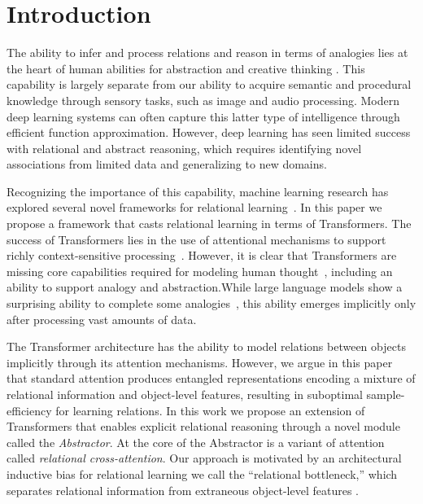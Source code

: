 \section{Introduction}

The ability to infer and process relations and reason in terms of analogies lies at the heart of human abilities for abstraction and creative thinking
\citep{snow,holyoak}. This capability is largely separate from our ability to acquire semantic and procedural knowledge through sensory tasks, such as image and audio processing. Modern deep learning systems can often capture this latter type of intelligence through efficient function approximation. However, deep learning has seen limited success with relational and abstract reasoning, which requires identifying novel associations from limited data and generalizing to new domains.

Recognizing the importance of this capability, machine learning research has explored several novel frameworks for relational learning~\citep{NTM, episodicControl, TEM,santoro1,battaglia,barrett:2018,shanahanExplicitlyRelationalNeural,esbn,mondal23learned}. In this paper we propose a framework that casts relational learning in terms of Transformers. The success of Transformers lies in the use of attentional mechanisms to support richly context-sensitive processing~\citep{vaswani2017attention,transformers,kerg2020untangling}. However, it is clear that Transformers are missing core capabilities required for modeling human thought~\citep{mahowald2023dissociating}, including an ability to support analogy and abstraction.While large language models show a surprising ability to complete some analogies~\citep{webb2023emergent}, this ability emerges implicitly only after processing vast amounts of data.

The Transformer architecture has the ability to model relations between objects implicitly through its attention mechanisms. However, we argue in this paper that standard attention produces entangled representations encoding a mixture of relational information and object-level features, resulting in suboptimal sample-efficiency for learning relations.
In this work we propose an extension of Transformers that enables explicit relational reasoning through a novel module called the \textit{Abstractor}. At the core of the Abstractor is a variant of attention called \textit{relational cross-attention}. Our approach is motivated by an architectural inductive bias for relational learning we call the ``relational bottleneck,'' which separates relational information from extraneous object-level features \citep[see][for a cognitive science perspective on this idea]{webb2024relational}.

